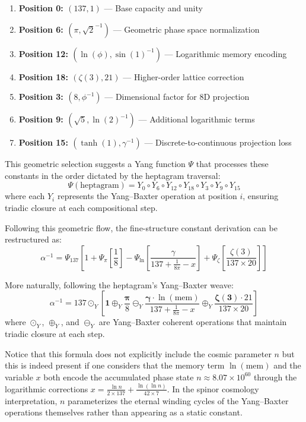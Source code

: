 \documentclass[pdflatex,sn-mathphys-num]{sn-jnl}
\theoremstyle{thmstyleone}
\theoremstyle{thmstyletwo}
\theoremstyle{thmstylethree}
\begin{document}
\begin{enumerate}
\item \textbf{Position 0: $(137, 1)$} --- Base capacity and unity
\item \textbf{Position 6: $(\pi, \sqrt{2}^{-1})$} --- Geometric phase space normalization  
\item \textbf{Position 12: $(\ln(\phi), \sin(1)^{-1})$} --- Logarithmic memory encoding
\item \textbf{Position 18: $(\zeta(3), 21)$} --- Higher-order lattice correction
\item \textbf{Position 3: $(8, \phi^{-1})$} --- Dimensional factor for 8D projection
\item \textbf{Position 9: $(\sqrt{5}, \ln(2)^{-1})$} --- Additional logarithmic terms
\item \textbf{Position 15: $(\tanh(1), \gamma^{-1})$} --- Discrete-to-continuous projection loss
\end{enumerate}

This geometric selection suggests a Yang function $\Psi$ that processes these constants in the order dictated by the heptagram traversal:
\begin{equation}
\Psi(\text{heptagram}) = Y_0 \circ Y_6 \circ Y_{12} \circ Y_{18} \circ Y_3 \circ Y_9 \circ Y_{15}
\end{equation}
where each $Y_i$ represents the Yang--Baxter operation at position $i$, ensuring triadic closure at each compositional step.

Following this geometric flow, the fine-structure constant derivation can be restructured as:
\begin{equation}
\alpha^{-1} = \Psi_{137}\left[1 + \Psi_\pi\left[\frac{1}{8}\right] - \Psi_{\ln}\left[\frac{\gamma}{137 + \frac{1}{8\pi} - x}\right] + \Psi_\zeta\left[\frac{\zeta(3)}{137 \times 20}\right]\right]
\end{equation}

More naturally, following the heptagram's Yang--Baxter weave:
\begin{equation}
\alpha^{-1} = 137 \odot_Y \left[\mathbf{1} \oplus_Y \frac{\boldsymbol{\pi}}{8} \ominus_Y \frac{\boldsymbol{\gamma} \cdot \ln(\text{mem})}{137 + \frac{1}{8\pi} - x} \oplus_Y \frac{\boldsymbol{\zeta(3)} \cdot 21}{137 \times 20}\right]
\end{equation}
where $\odot_Y$, $\oplus_Y$, and $\ominus_Y$ are Yang--Baxter coherent operations that maintain triadic closure at each step.

Notice that this formula does not explicitly include the cosmic parameter $n$ but this is indeed present if one considers that the memory term $\ln(\text{mem})$ and the variable $x$ both encode the accumulated phase state $n \approx 8.07 \times 10^{60}$ through the logarithmic corrections $x = \frac{\ln n}{2 \times 137} + \frac{\ln(\ln n)}{42 \times 7}$. In the spinor cosmology interpretation, $n$ parameterizes the eternal winding cycles of the Yang--Baxter operations themselves rather than appearing as a static constant.
\end{document}
